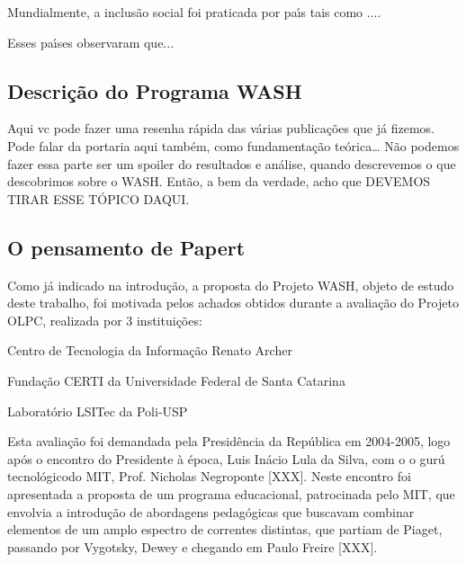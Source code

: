 \documentclass[
12pt,		%
openright,	%
twoside,  %
a4paper,			%
chapter=TITLE,		%
english,			%
french,				%
spanish,			%
brazil				%
]{USPSC-classe/USPSC_RedarTex}
\begin{document}
Mundialmente, a inclus\~ao social foi praticada por pa\'{\i}s tais como ....








Esses pa\'{\i}ses observaram que...








\subsection[Descri\c{c}\~ao do Programa WASH]{Descri\c{c}\~ao do Programa WASH}\label{Descri\c{c}\~ao do Programa WASH}
Aqui vc pode fazer uma resenha r\'apida das v\'arias publica\c{c}\~oes que j\'a fizemos. Pode falar da portaria aqui tamb\'em, como fundamenta\c{c}\~ao te\'orica… N\~ao podemos fazer essa parte ser um spoiler do resultados e an\'alise, quando descrevemos o que descobrimos sobre o WASH. Ent\~ao, a bem da verdade, acho que DEVEMOS TIRAR ESSE T\'OPICO DAQUI.








\subsection[O pensamento de Papert]{O pensamento de Papert}\label{O pensamento de Papert}
Como j\'a indicado na introdu\c{c}\~ao, a proposta do Projeto WASH, objeto de estudo deste trabalho, foi motivada pelos achados obtidos durante a avalia\c{c}\~ao do Projeto OLPC, realizada por 3 institui\c{c}\~oes:









\begin{alineas}
\item Centro de Tecnologia da Informa\c{c}\~ao Renato Archer
\item Funda\c{c}\~ao CERTI da Universidade Federal de Santa Catarina
\item Laborat\'orio LSITec da Poli-USP
\end{alineas}

Esta avalia\c{c}\~ao foi demandada pela Presid\^encia da Rep\'ublica em 2004-2005, logo ap\'os o encontro do Presidente \`a \'epoca, Luis In\'acio Lula da Silva, com o o \textquotedbl gur\'u tecnol\'ogico\textquotedbl  do MIT, Prof. Nicholas Negroponte [XXX]. Neste encontro foi apresentada a proposta de um programa educacional, patrocinada pelo MIT, que envolvia a introdu\c{c}\~ao de abordagens pedag\'ogicas que buscavam combinar elementos de um amplo espectro de correntes distintas, que partiam de Piaget, passando por Vygotsky, Dewey e chegando em Paulo Freire [XXX].
\end{document}

